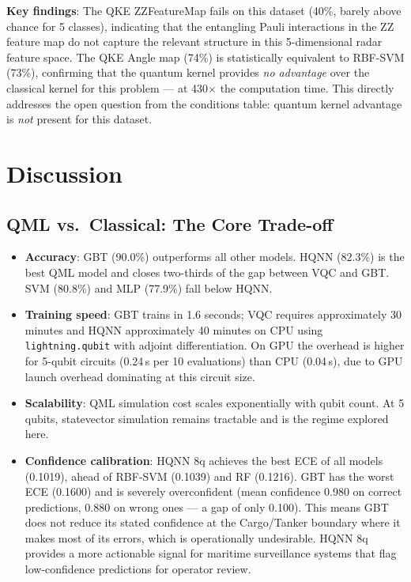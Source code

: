 \documentclass[journal]{IEEEtran}
\begin{document}
\noindent\textbf{Key findings}: The QKE ZZFeatureMap fails on this dataset (40\%,
barely above chance for 5 classes), indicating that the entangling Pauli
interactions in the ZZ feature map do not capture the relevant structure
in this 5-dimensional radar feature space. The QKE Angle map (74\%) is
statistically equivalent to RBF-SVM (73\%), confirming that the quantum
kernel provides \emph{no advantage} over the classical kernel for this problem
— at 430$\times$ the computation time. This directly addresses the open
question from the conditions table: quantum kernel advantage is \emph{not}
present for this dataset.

\section{Discussion}
\label{sec:discussion}

\subsection{QML vs.\ Classical: The Core Trade-off}

\begin{itemize}
  \item \textbf{Accuracy}: GBT (90.0\%) outperforms all other models.
        HQNN (82.3\%) is the best QML model and closes two-thirds of the
        gap between VQC and GBT. SVM (80.8\%) and MLP (77.9\%) fall below HQNN.
  \item \textbf{Training speed}: GBT trains in 1.6 seconds; VQC requires
        approximately 30 minutes and HQNN approximately 40 minutes on CPU
        using \texttt{lightning.qubit} with adjoint differentiation.
        On GPU the overhead is higher for 5-qubit circuits (0.24\,s per
        10 evaluations) than CPU (0.04\,s), due to GPU launch overhead
        dominating at this circuit size.
  \item \textbf{Scalability}: QML simulation cost scales exponentially with
        qubit count. At 5 qubits, statevector simulation remains tractable
        and is the regime explored here.
  \item \textbf{Confidence calibration}: HQNN 8q achieves the best ECE of all
        models (0.1019), ahead of RBF-SVM (0.1039) and RF (0.1216). GBT has
        the worst ECE (0.1600) and is severely overconfident (mean confidence
        0.980 on correct predictions, 0.880 on wrong ones — a gap of only
        0.100). This means GBT does not reduce its stated confidence at the
        Cargo/Tanker boundary where it makes most of its errors, which is
        operationally undesirable. HQNN 8q provides a more actionable signal
        for maritime surveillance systems that flag low-confidence predictions
        for operator review.
\end{itemize}
\end{document}
